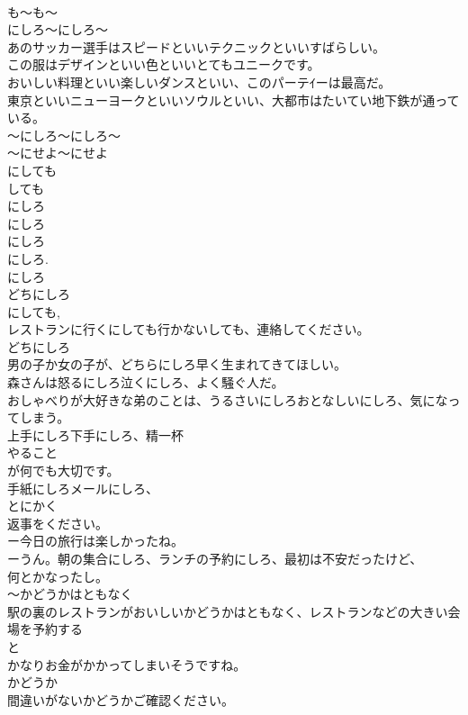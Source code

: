 \documentclass[8pt]{extreport}
\begin{document}
\begin{CJK}{UTF8}{min}
\\	も～も～ 
\\	にしろ～にしろ～ 
\\	あのサッカー選手はスピードといいテクニックといいすばらしい。
\\	この服はデザインといい色といいとてもユニークです。
\\	おいしい料理といい楽しいダンスといい、このパーテｲーは最高だ。
\\	東京といいニューヨークといいソウルといい、大都市はたいてい地下鉄が通っている。
\\	～にしろ～にしろ～
\\	～にせよ～にせよ
\\	にしても 
\\	しても
\\	にしろ
\\	にしろ 
\\	にしろ
\\	にしろ. 
\\	にしろ 
\\	どちにしろ 
\\	にしても, 
\\	レストランに行くにしても行かないしても、連絡してください。
\\	どちにしろ 
\\	男の子か女の子が、どちらにしろ早く生まれてきてほしい。
\\	森さんは怒るにしろ泣くにしろ、よく騒ぐ人だ。
\\	おしゃべりが大好きな弟のことは、うるさいにしろおとなしいにしろ、気になってしまう。
\\	上手にしろ下手にしろ、精一杯
\\	やること
\\	が何でも大切です。
\\	手紙にしろメールにしろ、
\\	とにかく
\\	返事をください。
\\	ー今日の旅行は楽しかったね。
\\	ーうん。朝の集合にしろ、ランチの予約にしろ、最初は不安だったけど、
\\	何とかなったし。
\\	～かどうかはともなく
\\	駅の裏のレストランがおいしいかどうかはともなく、レストランなどの大きい会場を予約する
\\	と
\\	かなりお金がかかってしまいそうですね。
\\	かどうか
\\	間違いがないかどうかご確認ください。

\end{CJK}
\end{document}
